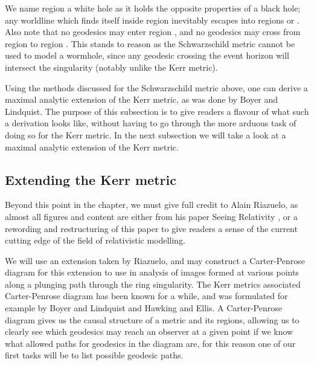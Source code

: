 \documentclass[oneside,openright,frontopenright, singlespacing]{dmathesis}
\begin{document}
\vspace{1em}
	We name region  a white hole as it holds the opposite properties of a black hole; any worldline which finds itself inside region  inevitably escapes into regions  or . Also note that no geodesics may enter region , and no geodesics may cross from region  to region . This stands to reason as the Schwarzschild metric cannot be used to model a wormhole, since any geodesic crossing the event horizon will intersect the singularity (notably unlike the Kerr metric).

\vspace{1em}
	Using the methods discussed for the Schwarzschild metric above, one can derive a maximal analytic extension of the Kerr metric, as was done by Boyer and Lindquist. The purpose of this subsection is to give readers a flavour of what such a derivation looks like, without having to go through the more arduous task of doing so for the Kerr metric. In the next subsection we will take a look at a maximal analytic extension of the Kerr metric.

\subsection{Extending the Kerr metric}\label{subsec:Section6.1.2}

	Beyond this point in the chapter, we must give full credit to Alain Riazuelo, as almost all figures and content are either from his paper Seeing Relativity \cite{seeingRelativity}, or a rewording and restructuring of this paper to give readers a sense of the current cutting edge of the field of relativistic modelling.

\vspace{1em}
	We will use an extension taken by Riazuelo, and may construct a Carter-Penrose diagram for this extension to use in analysis of images formed at various points along a plunging path through the ring singularity. The Kerr metrics associated Carter-Penrose diagram has been known for a while, and was formulated for example by Boyer and Lindquist\cite{boyer1967maximal} and Hawking and Ellis\cite{hawking1973large}. A Carter-Penrose diagram gives us the causal structure of a metric and its regions, allowing us to clearly see which geodesics may reach an observer at a given point if we know what allowed paths for geodesics in the diagram are, for this reason one of our first tasks will be to list possible geodesic paths.
\end{document}
